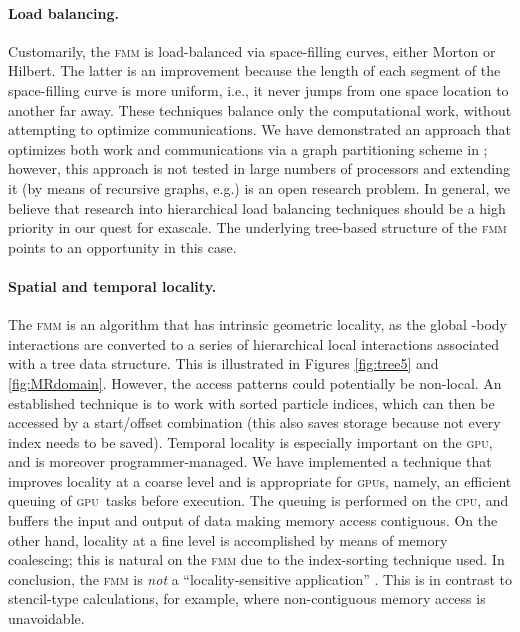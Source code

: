 \documentclass[10pt,twocolumn]{article}
\newcommand{\fmm}{\textsc{fmm}\xspace}
\newcommand{\cpu}{\textsc{cpu}}
\newcommand{\gpu}{\textsc{gpu}}
\newlength{\up}
\begin{document}
\vspace{\up}
\paragraph{Load balancing.}Customarily, the \fmm is load-balanced via space-filling curves, either Morton or Hilbert.  The latter is an improvement because the length of each segment of the space-filling curve is more uniform, i.e., it never jumps from one space location to another far away.  These techniques balance only the computational work, without attempting to optimize communications.  We have demonstrated an approach  that optimizes both work and communications via a graph partitioning scheme in \cite{CruzKnepleyBarba2010}; however, this approach is not tested in large numbers of processors and extending it (by means of recursive graphs, e.g.) is an open research problem. In general, we believe that research into hierarchical load balancing techniques should be a high priority in our quest for exascale. The underlying tree-based structure of the \fmm points to an opportunity in this case.

\vspace{\up}
\paragraph{Spatial and temporal locality.} The \fmm is an algorithm that has intrinsic geometric locality, as the global -body interactions are converted to a series of hierarchical local interactions associated with a tree data structure. This is illustrated in Figures \ref{fig:tree5} and \ref{fig:MRdomain}.  However, the access patterns could potentially be non-local.  An established technique is to work with sorted particle indices, which can then be accessed by a start/offset combination (this also saves storage because not every index needs to be saved).  Temporal locality is especially important on the \gpu, and is moreover programmer-managed.  We have implemented a technique that improves locality at a coarse level and is appropriate for \gpu s, namely, an efficient queuing of \gpu\ tasks before execution.  The queuing is performed on the \cpu, and buffers the input and output of data making memory access contiguous. On the other hand, locality at a fine level is accomplished by means of memory coalescing;  this is natural on the \fmm due to the index-sorting technique used. In conclusion, the \fmm is \emph{not} a ``locality-sensitive application'' \cite[]{DarpaExascale2008}. This is in contrast to stencil-type calculations, for example, where non-contiguous memory access is unavoidable.
\end{document}
